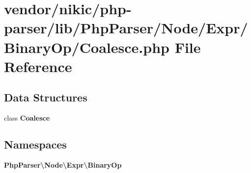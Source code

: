 \section{vendor/nikic/php-\/parser/lib/\+Php\+Parser/\+Node/\+Expr/\+Binary\+Op/\+Coalesce.php File Reference}
\label{_coalesce_8php}
\subsection*{Data Structures}
\begin{DoxyCompactItemize}
\item 
class {\bf Coalesce}
\end{DoxyCompactItemize}
\subsection*{Namespaces}
\begin{DoxyCompactItemize}
\item 
 {\bf Php\+Parser\textbackslash{}\+Node\textbackslash{}\+Expr\textbackslash{}\+Binary\+Op}
\end{DoxyCompactItemize}
